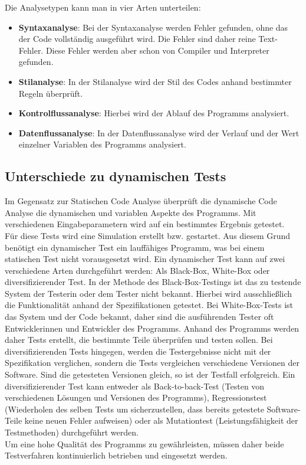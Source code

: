 Die Analysetypen kann man in vier Arten unterteilen:
\begin{itemize}
\item \textbf{Syntaxanalyse}:
Bei der Syntaxanalyse werden Fehler gefunden, ohne das der Code vollständig ausgeführt wird. Die Fehler sind daher reine Text-Fehler. Diese Fehler werden aber schon von Compiler und Interpreter gefunden.
\item \textbf{Stilanalyse}:
In der Stilanalyse wird der Stil des Codes anhand bestimmter Regeln überprüft.
\item \textbf{Kontrolflussanalyse}:
Hierbei wird der Ablauf des Programms analysiert.
\item \textbf{Datenflussanalyse}:
In der Datenflussanalyse wird der Verlauf und der Wert einzelner Variablen des Programms analysiert.
\end{itemize}

\subsection{Unterschiede zu dynamischen Tests}
Im Gegensatz zur Statischen Code Analyse überprüft die dynamische Code Analyse die dynamischen und variablen Aspekte des Programms. Mit verschiedenen Eingabeparametern wird auf ein bestimmtes Ergebnis getestet. ~\parencite{grigorenkoDynTest} Für diese Tests wird eine Simulation erstellt bzw. gestartet. Aus diesem Grund benötigt ein dynamischer Test ein lauffähiges Programm, was bei einem statischen Test nicht vorausgesetzt wird. Ein dynamischer Test kann auf zwei verschiedene Arten durchgeführt werden: Als Black-Box, White-Box oder diversifizierender Test.
In der Methode des Black-Box-Testings ist das zu testende System der Testerin oder dem Tester nicht bekannt. Hierbei wird ausschließlich die Funktionalität anhand der Spezifikationen getestet. Bei White-Box-Tests ist das System und der Code bekannt, daher sind die ausführenden Tester oft Entwicklerinnen und Entwickler des Programms. Anhand des Programms werden daher Tests erstellt, die bestimmte Teile überprüfen und testen sollen. Bei diversifizierenden Tests hingegen, werden die Testergebnisse nicht mit der Spezifikation verglichen, sondern die Tests vergleichen verschiedene Versionen der Software. Sind die getesteten Versionen gleich, so ist der Testfall erfolgreich. Ein diversifizierender Test kann entweder als Back-to-back-Test (Testen von verschiedenen Lösungen und Versionen des Programms), Regressionstest (Wiederholen des selben Tests um sicherzustellen, dass bereits getestete Software-Teile keine neuen Fehler aufweisen) oder als Mutationtest (Leistungsfähigkeit der Testmethoden) durchgeführt werden. ~\parencite{bommer2016softwarewartung}
\\
Um eine hohe Qualität des Programms zu gewährleisten, müssen daher beide Testverfahren kontinuierlich betrieben und eingesetzt werden.
